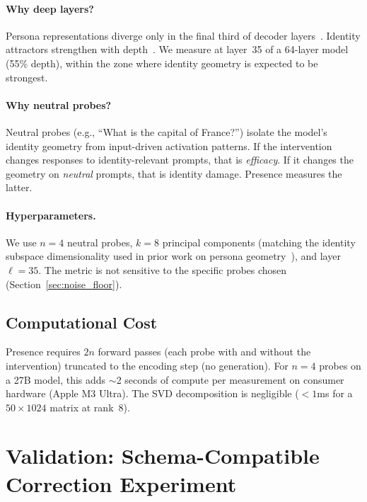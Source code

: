 \documentclass[11pt,a4paper]{article}
\begin{document}
\paragraph{Why deep layers?}
Persona representations diverge only in the final third of decoder
layers~\citep{cintas2025localizing}. Identity attractors strengthen with
depth~\citep{vasilenko2026identity}. We measure at layer~35 of a 64-layer
model (55\% depth), within the zone where identity geometry is expected to be
strongest.

\paragraph{Why neutral probes?}
Neutral probes (e.g., ``What is the capital of France?'') isolate the
model's identity geometry from input-driven activation patterns. If the
intervention changes responses to identity-relevant prompts, that is
\emph{efficacy}. If it changes the geometry on \emph{neutral} prompts, that
is identity damage. Presence measures the latter.

\paragraph{Hyperparameters.}
We use $n = 4$ neutral probes, $k = 8$ principal components (matching the
identity subspace dimensionality used in prior work on persona
geometry~\citep{chen2025persona}), and layer $\ell = 35$. The metric is not
sensitive to the specific probes chosen (Section~\ref{sec:noise_floor}).

\subsection{Computational Cost}

Presence requires $2n$ forward passes (each probe with and without the
intervention) truncated to the encoding step (no generation). For $n = 4$
probes on a 27B model, this adds $\sim$2 seconds of compute per measurement
on consumer hardware (Apple M3 Ultra). The SVD decomposition is negligible
($< 1$ms for a $50 \times 1024$ matrix at rank~8).

\section{Validation: Schema-Compatible Correction Experiment}
\label{sec:validation}
\end{document}
